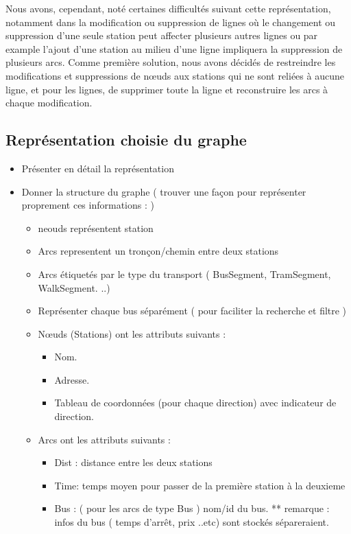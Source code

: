 \begin{itemize}
	Nous avons, cependant, noté certaines difficultés suivant cette représentation, notamment dans la modification ou suppression de lignes où le changement ou suppression d'une seule station peut affecter plusieurs autres lignes ou par example l'ajout d'une station au milieu d'une ligne impliquera la suppression de plusieurs arcs.
	Comme première solution, nous avons décidés de restreindre les modifications et suppressions de nœuds aux stations qui ne sont reliées à aucune ligne, et pour les lignes, de supprimer toute la ligne et reconstruire les arcs à chaque modification.
	     
\end{itemize}
\subsection{Représentation choisie du graphe}
	\begin{itemize}
	\item Présenter en détail la représentation
	\item Donner la structure du graphe ( trouver une façon pour représenter proprement ces informations : )
	\begin{itemize}
		 \item  neouds représentent station
		 \item Arcs representent un tronçon/chemin entre deux stations
		 \item Arcs étiquetés par le type du transport ( BusSegment, TramSegment, WalkSegment. ..) 
		 \item Représenter chaque bus séparément ( pour faciliter la recherche et filtre ) 
		 \item Nœuds (Stations) ont les attributs suivants : 
		 \begin{itemize}
		 	\item Nom.
		 	\item Adresse.
		 	\item Tableau de coordonnées (pour chaque direction) avec indicateur de direction.
		 \end{itemize}
		 \item Arcs ont les attributs suivants :
		 \begin{itemize}
		 		\item Dist : distance entre les deux stations
		 		\item Time: temps moyen pour passer de la première station à la deuxieme
		 		\item Bus : ( pour les arcs de type Bus ) nom/id du bus.
		 		** remarque : infos du bus ( temps d'arrêt, prix ..etc) sont stockés sépareraient.
		 \end{itemize}
	\end{itemize}
	\end{itemize}


